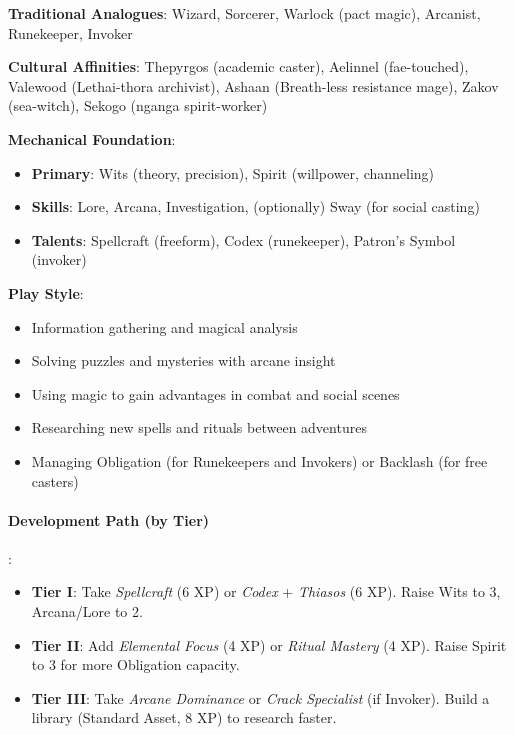\textbf{Traditional Analogues}: Wizard, Sorcerer, Warlock (pact magic), Arcanist, Runekeeper, Invoker

\textbf{Cultural Affinities}: Thepyrgos (academic caster), Aelinnel (fae-touched), Valewood (Lethai-thora archivist), Ashaan (Breath-less resistance mage), Zakov (sea-witch), Sekogo (nganga spirit-worker)

\textbf{Mechanical Foundation}:
\begin{itemize}
\item \textbf{Primary}: Wits (theory, precision), Spirit (willpower, channeling)
\item \textbf{Skills}: Lore, Arcana, Investigation, (optionally) Sway (for social casting)
\item \textbf{Talents}: Spellcraft (freeform), Codex (runekeeper), Patron's Symbol (invoker)
\end{itemize}

\textbf{Play Style}:
\begin{itemize}
\item Information gathering and magical analysis
\item Solving puzzles and mysteries with arcane insight
\item Using magic to gain advantages in combat and social scenes
\item Researching new spells and rituals between adventures
\item Managing Obligation (for Runekeepers and Invokers) or Backlash (for free casters)
\end{itemize}

\paragraph{Development Path (by Tier)}:
\begin{itemize}
\item \textbf{Tier I}: Take \emph{Spellcraft} (6 XP) or \emph{Codex} + \emph{Thiasos} (6 XP). Raise Wits to 3, Arcana/Lore to 2.
\item \textbf{Tier II}: Add \emph{Elemental Focus} (4 XP) or \emph{Ritual Mastery} (4 XP). Raise Spirit to 3 for more Obligation capacity.
\item \textbf{Tier III}: Take \emph{Arcane Dominance} or \emph{Crack Specialist} (if Invoker). Build a library (Standard Asset, 8 XP) to research faster.
\end{itemize}

